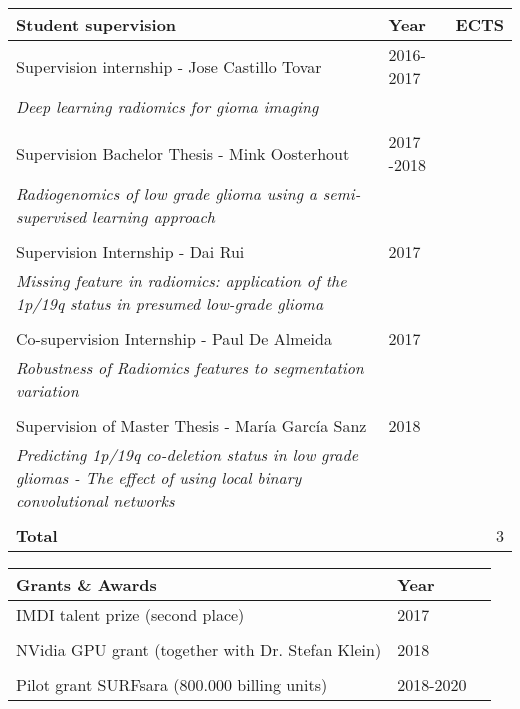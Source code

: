 \vspace*{0.5cm}
\begin{tabular}{L{8cm}lr}
    \textbf{Student supervision}&\textbf{Year}&\textbf{ECTS}\\
    \toprule
    Supervision internship - Jose Castillo Tovar & 2016-2017 \\
    \textit{Deep learning radiomics for gioma imaging}\\
    \\
    Supervision Bachelor Thesis - Mink Oosterhout & 2017 -2018\\
    \textit{Radiogenomics of low grade glioma using a semi-supervised learning approach}\\
    \\
    Supervision Internship - Dai Rui & 2017\\
    \textit{Missing feature in radiomics: application of the 1p/19q status in presumed low-grade glioma}\\
    \\
    Co-supervision Internship - Paul De Almeida & 2017\\
    \textit{Robustness of Radiomics features to segmentation variation}\\
    \\
    Supervision of Master Thesis - Mar{\'i}a Garc{\'i}a Sanz & 2018\\
    \textit{Predicting 1p/19q co-deletion status in low grade gliomas - The effect of using local binary convolutional networks}\\
    \\
    \textbf{Total} & & 3\\
\end{tabular}


\newpage
\begin{tabular}{L{8cm}lr}
    \textbf{Grants \& Awards}&\textbf{Year}\\
    \toprule
    IMDI talent prize (second place) & 2017\\
    \\
    NVidia GPU grant (together with Dr. Stefan Klein) & 2018\\
    \\
    Pilot grant SURFsara (800.000 billing units) & 2018-2020\\
\end{tabular}

